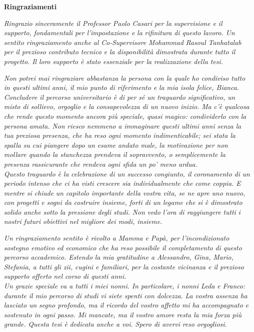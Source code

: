 \thispagestyle{empty}

\begin{center}
  {\bf \Huge Ringraziamenti}
\end{center}

\vspace{4cm}

\emph{
Ringrazio sinceramente il Professor Paolo Casari per la supervisione e il supporto, fondamentali per l'impostazione e la rifinitura di questo lavoro.
Un sentito ringraziamento anche al Co-Supervisore Mohammad Rasoul Tanhatalab per il prezioso contributo tecnico e la disponibilità dimostrata durante tutto il progetto. Il loro supporto è stato essenziale per la realizzazione della tesi.
}

\;



\emph{
Non potrei mai ringraziare abbastanza la persona con la quale ho condiviso tutto in questi ultimi anni, il mio punto di riferimento e la mia isola felice, Bianca. 
Concludere il percorso universitario è di per sé un traguardo significativo, un misto di sollievo, orgoglio e la consapevolezza di un nuovo inizio. Ma c'è qualcosa che rende questo momento ancora più speciale, quasi magico: condividerlo con la persona amata. Non riesco nemmeno a immaginare questi ultimi anni senza la tua preziosa presenza, che ha reso ogni momento indimenticabile; sei stata la spalla su cui piangere dopo un esame andato male, la motivazione per non mollare quando la stanchezza prendeva il sopravvento, o semplicemente la presenza rassicurante che rendeva ogni sfida un po' meno ardua. 
\noindent\\
Questo traguardo è la celebrazione di un successo congiunto, il coronamento di un periodo intenso che ci ha visti crescere sia individualmente che come coppia. E mentre si chiude un capitolo importante della vostra vita, se ne apre uno nuovo, con progetti e sogni da costruire insieme, forti di un legame che si è dimostrato solido anche sotto la pressione degli studi. Non vedo l'ora di raggiungere tutti i nostri futuri obiettivi nel migliore dei modi, insieme.
}

\;

\emph{Un ringraziamento sentito è rivolto a Mamma e Papà, per l'incondizionato sostegno emotivo ed economico che ha reso possibile il completamento di questo percorso accademico.
Estendo la mia gratitudine a Alessandro, Gina, Mario, Stefania, a tutti gli zii, cugini e familiari, per la costante vicinanza e il prezioso supporto offerto nel corso di questi anni.
\noindent\\
Un grazie speciale va a tutti i miei nonni.
In particolare, i nonni Leda e Franco: durante il mio percorso di studi vi siete spenti con dolcezza. La vostra assenza ha lasciato un segno profondo, ma il ricordo del vostro affetto mi ha accompagnato e sostenuto in ogni passo.
Mi mancate, ma il vostro amore resta la mia forza più grande.
Questa tesi è dedicata anche a voi. Spero di avervi reso orgogliosi.}

